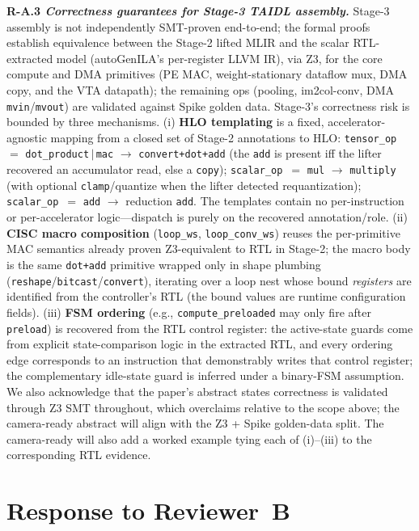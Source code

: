 \documentclass[sigconf, anonymous]{acmart}
\begin{document}
\noindent\textbf{R-A.3 \emph{Correctness guarantees for Stage-3 TAIDL assembly.}}
Stage-3 assembly is not independently SMT-proven end-to-end; the formal
proofs establish equivalence between the Stage-2 lifted MLIR and the
scalar RTL-extracted model (autoGenILA's per-register LLVM IR), via Z3,
for the core compute and DMA primitives (PE MAC, weight-stationary
dataflow mux, DMA copy, and the VTA datapath); the remaining ops
(pooling, im2col-conv, DMA \texttt{mvin}/\texttt{mvout}) are validated
against Spike golden data. Stage-3's correctness risk is bounded by
three mechanisms.
(i) \textbf{HLO templating} is a fixed, accelerator-agnostic mapping
from a closed set of Stage-2 annotations to HLO:
\texttt{tensor\_op}~$=$ \texttt{dot\_product}\,$|$\,\texttt{mac} $\to$
\texttt{convert+dot+add} (the \texttt{add} is present iff the lifter
recovered an accumulator read, else a \texttt{copy});
\texttt{scalar\_op}~$=$ \texttt{mul} $\to$ \texttt{multiply} (with
optional \texttt{clamp}/quantize when the lifter detected
requantization); \texttt{scalar\_op}~$=$ \texttt{add} $\to$ reduction
\texttt{add}. The templates contain no per-instruction or
per-accelerator logic---dispatch is purely on the recovered
annotation/role.
(ii) \textbf{CISC macro composition} (\texttt{loop\_ws},
\texttt{loop\_conv\_ws}) reuses the per-primitive MAC semantics already
proven Z3-equivalent to RTL in Stage-2; the macro body is the same
\texttt{dot+add} primitive wrapped only in shape plumbing
(\texttt{reshape}/\texttt{bitcast}/\texttt{convert}), iterating over a
loop nest whose bound \emph{registers} are identified from the
controller's RTL (the bound values are runtime configuration fields).
(iii) \textbf{FSM ordering} (e.g., \texttt{compute\_preloaded} may only
fire after \texttt{preload}) is recovered from the RTL control register:
the active-state guards come from explicit state-comparison logic in
the extracted RTL, and every ordering edge corresponds to an
instruction that demonstrably writes that control register; the
complementary idle-state guard is inferred under a binary-FSM
assumption.
We also acknowledge that the paper's abstract states correctness is
validated through Z3 SMT throughout, which overclaims relative to the
scope above; the camera-ready abstract will align with the Z3 + Spike
golden-data split. The camera-ready will also add a worked example
tying each of (i)--(iii) to the corresponding RTL evidence.

\section*{Response to Reviewer~B}
\end{document}
